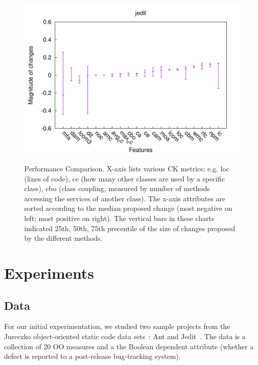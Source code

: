 \documentclass[conference]{IEEEtran}
\begin{document}
\begin{figure}[b!]
\begin{minipage}{0.5\linewidth}
{				\includegraphics[width=\linewidth]{jedit2.png}}
		\end{minipage}
		\caption{Performance Comparison.
		X-axis lists various CK metrics; e.g.  loc (lines of code),
		ce (how many other classes are used by a specific class),
		cbo (class coupling, measured by number of methods accessing
		the services of another class).  The x-axis attributes  
		are sorted according to the median
		proposed change  (most negative on left; most positive on right). The vertical bars in these charts indicated 25th, 50th, 75th precentile of the size of changes proposed by the different methods.}
		\label{fig:deltas}
	\end{figure}

	
	
	\section{Experiments}
	\subsection{Data}
	For our initial experimentation, we studied two sample projects from the Jureczko object-oriented static code data sets~\cite{jureczko10}: Ant and  Jedit~\cite{promiserepo}. The data is a collection of 20 OO measures and a the Boolean dependent attribute (whether a defect is reported to a post-release bug-tracking system). 
	
\end{document}
